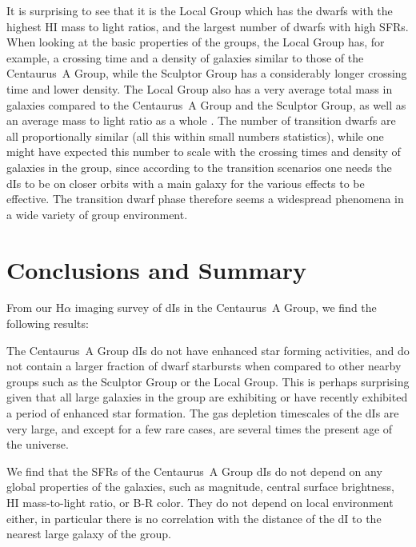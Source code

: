 \documentclass[preprint]{aastex}
\begin{document}
It is surprising to see that it is the Local Group which has
the dwarfs with the highest HI mass to light ratios, 
and the largest number of dwarfs with high 
SFRs. When looking at the basic properties of the groups,
the Local Group has, for example, a crossing time and a density of galaxies 
similar to those of the
Centaurus~A Group, while the Sculptor Group has a considerably longer 
crossing time and lower density.
The Local Group also has a very average total mass in galaxies compared to 
the Centaurus~A Group and the Sculptor Group, as well as an average 
mass to light ratio as a whole \citep{k05}.  
The number of transition dwarfs are all proportionally similar (all this
within small numbers statistics), while one might have expected this number
to scale with 
the crossing times and density of galaxies in the group, since
according to the transition scenarios one needs the dIs to be on closer
orbits with a main galaxy for the various effects to be effective.
The transition dwarf phase therefore seems a widespread phenomena 
in a wide variety of group environment.

\section{Conclusions and Summary}

From our H$\alpha$ imaging survey of dIs in the Centaurus~A Group,
we find the following results:

The Centaurus~A Group dIs do not have enhanced star forming activities,
and do not contain a larger fraction of dwarf starbursts when compared to other
nearby groups such as the Sculptor Group or the Local Group. This is
perhaps surprising given that all large galaxies in the group are
exhibiting or have recently exhibited a period of enhanced star formation.
The gas depletion timescales of the dIs are very large, and except
for a few rare cases, are several times the present age of the universe.

We find that the SFRs of the Centaurus~A Group dIs do not
depend on any global properties of the galaxies, such as magnitude, central 
surface brightness, HI mass-to-light ratio, or B-R color. They do not depend
on local environment either, in particular there is 
no correlation with the distance of the dI to the nearest large galaxy
of the group.
\end{document}
